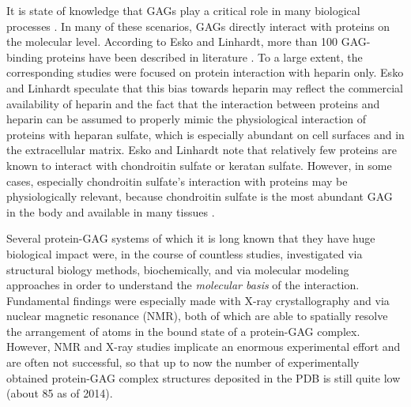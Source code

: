 It is state of knowledge that GAGs play a critical role in many biological
processes \cite{handel_2005}. In many of these scenarios, GAGs directly interact
with proteins on the molecular level. According to Esko and Linhardt, more than
100 GAG-binding proteins have been described in literature
\cite{essentials_glycobiology_protgags_2009}. To a large extent, the
corresponding studies were focused on protein interaction with heparin only.
Esko and Linhardt speculate that this bias towards heparin may reflect the
commercial availability of heparin and the fact that the interaction between
proteins and heparin can be assumed to properly mimic the physiological
interaction of proteins with heparan sulfate, which is especially abundant on
cell surfaces and in the extracellular matrix. Esko and Linhardt note that
relatively few proteins are known to interact with chondroitin sulfate or
keratan sulfate. However, in some cases, especially chondroitin sulfate's
interaction with proteins may be physiologically relevant, because chondroitin
sulfate is the most abundant GAG in the body
\cite{gandhi_structure_2008} and available in many tissues
\cite{essentials_glycobiology_protgags_2009}.

Several protein-GAG systems of which it is long known that they have huge
biological impact were, in the course of countless studies, investigated via
structural biology methods, biochemically, and via molecular modeling approaches
in order to understand the \textit{molecular basis} of the interaction.
Fundamental findings were especially made with X-ray crystallography and via
nuclear magnetic resonance (NMR), both of which are able to spatially resolve
the arrangement of atoms in the bound state of a protein-GAG complex. However,
NMR and X-ray studies implicate an enormous experimental effort and are often
not successful, so that up to now the number of experimentally obtained
protein-GAG complex structures deposited in the PDB is still quite low (about
85 as of 2014).


